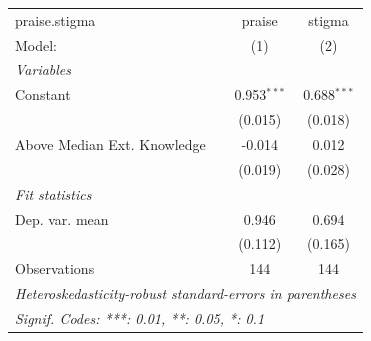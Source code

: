 
\begingroup
\centering
\begin{tabular}{lcc}
   \tabularnewline \midrule \midrule
   praise.stigma               & praise        & stigma \\   
   Model:                      & (1)           & (2)\\  
   \midrule
   \emph{Variables}\\
   Constant                    & 0.953$^{***}$ & 0.688$^{***}$\\   
                               & (0.015)       & (0.018)\\   
   Above Median Ext. Knowledge & -0.014        & 0.012\\   
                               & (0.019)       & (0.028)\\   
   \midrule
   \emph{Fit statistics}\\
   Dep. var. mean              & 0.946         & 0.694\\  
                               & (0.112)       & (0.165)\\  
   Observations                & 144           & 144\\  
   \midrule \midrule
   \multicolumn{3}{l}{\emph{Heteroskedasticity-robust standard-errors in parentheses}}\\
   \multicolumn{3}{l}{\emph{Signif. Codes: ***: 0.01, **: 0.05, *: 0.1}}\\
\end{tabular}
\par\endgroup


